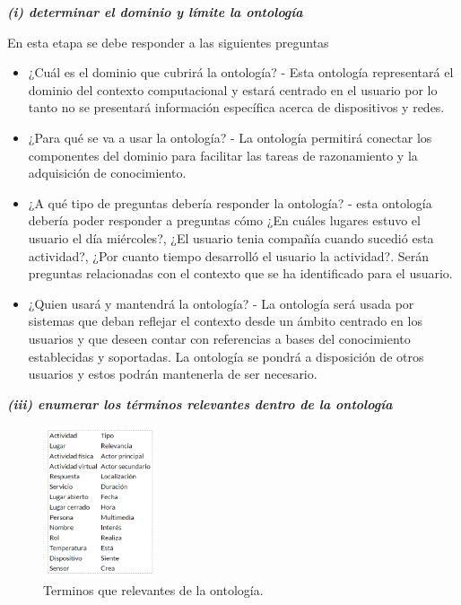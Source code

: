 \textbf{\textit{(i) determinar el dominio y límite la ontología}}

En esta etapa se debe responder a las siguientes preguntas 

\begin{itemize}
    \item ¿Cuál es el dominio que cubrirá la ontología? - Esta ontología representará el dominio del contexto computacional y estará centrado en el usuario por lo tanto no se presentará información específica acerca de dispositivos y redes.
    \item ¿Para qué se va a usar la ontología? - La ontología permitirá conectar los componentes del dominio para facilitar las tareas de razonamiento y la adquisición de conocimiento.
    \item ¿A qué tipo de preguntas debería responder la ontología? - esta ontología debería poder responder a preguntas cómo ¿En cuáles lugares estuvo el usuario el día miércoles?, ¿El usuario tenia compañía cuando sucedió esta actividad?, ¿Por cuanto tiempo desarrolló el usuario la actividad?. Serán preguntas relacionadas con el contexto que se ha identificado para el usuario.
    \item ¿Quien usará y mantendrá la ontología? - La ontología será usada por sistemas que deban reflejar el contexto desde un ámbito centrado en los usuarios y que deseen contar con referencias a bases del conocimiento establecidas y soportadas. La ontología se pondrá a disposición de otros usuarios y estos podrán mantenerla de ser necesario.
\end{itemize}

\textbf{\textit{(iii) enumerar los términos relevantes dentro de la ontología}}

\begin{figure}[!ht]
\centering%
\includegraphics[width=0.3\textwidth]{Cap3/Images/Contexto_Modelado_Terminos}%
\caption{Terminos que relevantes de la ontología.} \label{fig:Contexto_Modelado_Terminos}
\end{figure}

